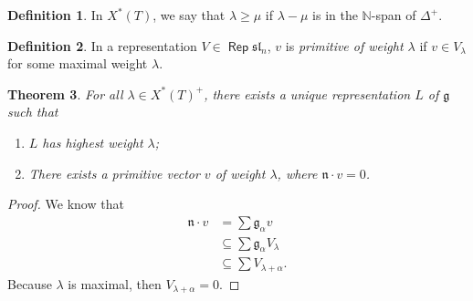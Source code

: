 \documentclass[leqno, openany]{memoir}
\newtheorem{thm}{Theorem}[chapter]
\theoremstyle{definition}
\newtheorem{defn}[thm]{Definition}
\theoremstyle{remark}
\theoremstyle{plain}
\theoremstyle{definition}
\theoremstyle{remark}
\newcommand{\mf}[1]{\mathfrak{#1}}
\newcommand{\mb}[1]{\mathbb{#1}}
\DeclareMathOperator{\Rep}{\mathsf{Rep}}
\begin{document}
\begin{defn}
    In $X^*(T)$, we say that $\lambda \geq \mu$ if $\lambda - \mu$ is in the $\mb{N}$-span of $\Delta^+$.
\end{defn}

\begin{defn}
    In a representation $V \in \Rep \mf{sl}_n$, $v$ is \textit{primitive of weight $\lambda$} if $v \in V_{\lambda}$ for some maximal weight $\lambda$.
\end{defn}

\begin{thm}
    For all $\lambda \in X^*(T)^+$, there exists a unique representation $L$ of $\mf{g}$ such that
    \begin{enumerate}
        \item $L$ has highest weight $\lambda$;
        \item There exists a primitive vector $v$ of weight $\lambda$, where $\mf{n} \cdot v = 0$.
    \end{enumerate}
\end{thm}

\begin{proof}
    We know that
    \begin{align*}
        \mf{n} \cdot v &= \sum \mf{g}_{\alpha} v \\
                       &\subseteq \sum \mf{g_{\alpha}} V_{\lambda} \\
                       &\subseteq \sum V_{\lambda + \alpha}.
    \end{align*}
    Because $\lambda$ is maximal, then $V_{\lambda + \alpha} = 0$.
\end{proof}
\end{document}
